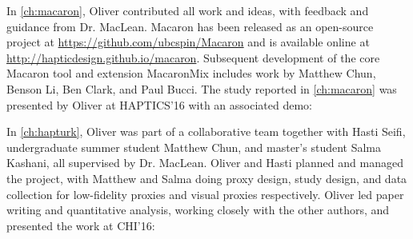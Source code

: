 
\noindent
In \autoref{ch:macaron}, Oliver contributed all work and ideas, with feedback and guidance from Dr. MacLean.
Macaron has been released as an open-source project at \url{https://github.com/ubcspin/Macaron} and is available online at \url{http://hapticdesign.github.io/macaron}.
Subsequent development of the core Macaron tool and extension MacaronMix includes work by Matthew Chun, Benson Li, Ben Clark, and Paul Bucci.
The study reported in \autoref{ch:macaron} was presented by Oliver at HAPTICS'16 with an associated demo: 



\noindent
In \autoref{ch:hapturk}, Oliver was part of a collaborative team together with Hasti Seifi, undergraduate summer student Matthew Chun, and master's student Salma Kashani, all supervised by Dr. MacLean.
Oliver and Hasti planned and managed the project, with Matthew and Salma doing proxy design, study design, and data collection for low-fidelity proxies and visual proxies respectively.
Oliver led paper writing and quantitative analysis, working closely with the other authors, and presented the work at CHI'16:


